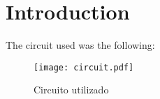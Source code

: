 \section{Introduction}
\label{sec:introduction}


The circuit used was the following:

\begin{figure}[H] \centering
\texttt{[image: circuit.pdf]}
\caption{Circuito utilizado}
\label{fig:circuit}
\end{figure}